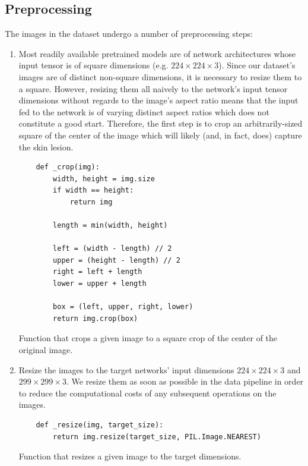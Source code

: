 \subsection{Preprocessing}
\label{subsection:preprocessing}

The images in the dataset undergo a number of preprocessing steps:

\begin{enumerate}
    \item Most readily available pretrained models are of network architectures whose input tensor is of square dimensions (e.g. $224 \times 224 \times 3$). Since our dataset's images are of distinct non-square dimensions, it is necessary to resize them to a square. However, resizing them all naively to the network's input tensor dimensions without regards to the image's aspect ratio means that the input fed to the network is of varying distinct aspect ratios which does not constitute a good start. Therefore, the first step is to crop an arbitrarily-sized square of the center of the image which will likely (and, in fact, does) capture the skin lesion.

    \begin{listing}[ht]
    \begin{verbatim}
    def _crop(img):
        width, height = img.size
        if width == height:
            return img

        length = min(width, height)

        left = (width - length) // 2
        upper = (height - length) // 2
        right = left + length
        lower = upper + length

        box = (left, upper, right, lower)
        return img.crop(box)
    \end{verbatim}
    \caption{Function that crops a given image to a square crop of the center of the original image.}
    \label{code:crop}
    \end{listing}

\item Resize the images to the target networks' input dimensions $224 \times 224 \times 3$ and $299 \times 299 \times 3$. We resize them as soon as possible in the data pipeline in order to reduce the computational costs of any subsequent operations on the images.

    \begin{listing}[ht]
    \begin{verbatim}
    def _resize(img, target_size):
        return img.resize(target_size, PIL.Image.NEAREST)
    \end{verbatim}
    \caption{Function that resizes a given image to the target dimensions.}
    \label{code:resize}
    \end{listing}


\end{enumerate}
